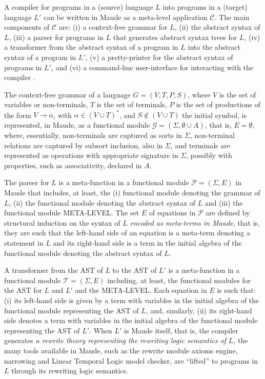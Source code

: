 \documentclass[a4paper,openany]{book}
\begin{document}
A compiler for programs in a (source) language $L$ into programs in a (target) language $L'$ can be written in Maude as a meta-level application $\mathcal{C}$. The main components of $\mathcal{C}$ are: (i) a context-free grammar for $L$, (ii) the abstract syntax of $L$, (iii) a parser for programs in $L$ that generates abstract syntax trees for $L$, (iv) a transformer from the abstract syntax of a program in $L$ into the abstract syntax of a program in $L'$, (v) a pretty-printer for the abstract syntax of programs in $L'$, and (vi) a command-line user-interface for interacting with the compiler . 

The context-free grammar of a language $G = (V, T, P, S)$, where $V$ is the set of variables or non-terminals, $T$ is the set of terminals, $P$ is the set of productions of the form $V \to \alpha$, with $\alpha \in (V \cup T)^*$, and $S \not\in (V \cup T)$ the initial symbol, is represented, in Maude, as a functional module $\mathcal{G} = (\Sigma, \emptyset \cup A)$, that is, $E = \emptyset$, where, essentially, non-terminals are captured as sorts in $\Sigma$, non-terminal relations are captured by subsort inclusion, also in $\Sigma$, and terminals are represented as operations with appropriate signature in $\Sigma$, possibly with properties, such as associativity, declared in $A$. 

The parser for $L$ is a meta-function in a functional module $\mathcal{P} = (\Sigma, E)$ in Maude that includes, at least, the (i) functional module denoting the grammar of $L$, (ii) the functional module denoting the abstract syntax of $L$ and (iii) the functional module META-LEVEL. The set $E$ of equations in $\mathcal{P}$ are defined by structural induction on the syntax of $L$ \emph{encoded as meta-terms in Maude}, that is, they are such that the left-hand side of an equation is a meta-term denoting a statement in $L$ and its right-hand side is a term in the initial algebra of the functional module denoting the abstract syntax of $L$.

A transformer from the AST of $L$ to the AST of $L'$ is a meta-function in a functional module $\mathcal{T} = (\Sigma, E)$ including, at least, the functional modules for the AST for $L$ and $L'$ and the META-LEVEL. Each equation in $E$ is such that: (i) its left-hand side is given by a term with variables in the initial algebra of the functional module representing the AST of $L$, and, similarly, (ii) its right-hand side denotes a term with variables in the initial algebra of the functional module representing the AST of $L'$. When $L'$ is Maude itself, that is, the compiler generates \emph{a rewrite theory representing the rewriting logic semantics of} $L$, the many tools available in Maude, such as the rewrite module axioms engine, narrowing and Linear Temporal Logic model checker, are ``lifted'' to programs in $L$ through its rewriting logic semantics.
\end{document}
